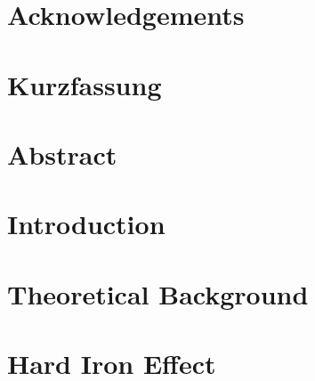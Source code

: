 \documentclass[12pt,a4paper,twoside,open=right,bibliography=totoc,BCOR=10mm]{scrreprt}
\begin{document}





\chapter*{Acknowledgements}
\label{ch:acknowledgements}


\chapter*{Kurzfassung}
\label{ch:kurzfassung}


\chapter*{Abstract}
\label{ch:abstract}


\setcounter{tocdepth}{1}
\tableofcontents
{}
\newpage
\cleardoublepage %
\setcounter{page}{1}

\chapter{Introduction}
\label{ch:introduction}


\chapter{Theoretical Background}
\label{ch:background}


\chapter{Hard Iron Effect}
\label{ch:problem}

\end{document}
